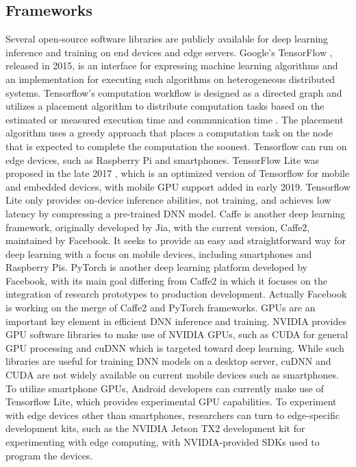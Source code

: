 \subsection{Frameworks}
Several open-source software libraries are publicly available for deep learning inference and training on end devices and edge servers. Google's TensorFlow \cite{tensorflow2015-whitepaper}, released in 2015, is an interface for expressing machine learning algorithms and an implementation for executing such algorithms on heterogeneous distributed systems. Tensorflow's computation workflow is designed as a directed graph and utilizes a placement algorithm to distribute computation tasks based on the estimated or measured execution time and communication time \cite{abadi2016tensorflow}. The placement algorithm uses a greedy approach that places a computation task on the node that is expected to complete the computation the soonest. Tensorflow can run on edge devices, such as Raspberry Pi and smartphones. TensorFlow Lite was proposed in the late 2017 \cite{tensorflowlite}, which is an optimized version of Tensorflow for mobile and embedded devices, with mobile GPU support added in early 2019. 
Tensorflow Lite only provides on-device inference abilities, not training, and achieves low latency by compressing a pre-trained DNN model.
Caffe \cite{Caffe} is another deep learning framework, originally developed by Jia, with the current version, Caffe2, maintained by Facebook. It seeks to provide an easy and straightforward way for deep learning with a focus on mobile devices, including smartphones and Raspberry Pis. PyTorch \cite{NEURIPS2019_9015} is another deep learning platform developed by Facebook, with its main goal differing from Caffe2 in which it focuses on the integration of research prototypes to production development. Actually Facebook is working on the merge of Caffe2 and PyTorch frameworks.
GPUs are an important key element in efficient DNN inference and training. NVIDIA provides GPU software libraries to make use of NVIDIA GPUs, such as CUDA \cite{CUDA} for general GPU processing and cuDNN \cite{cuDNN} which is targeted toward deep learning. While such libraries are useful for training DNN models on a desktop server, cuDNN and CUDA are not widely available on current mobile devices such as smartphones. To utilize smartphone GPUs, Android developers can currently make use of Tensorflow Lite, which provides experimental GPU capabilities. To experiment with edge devices other than smartphones, researchers can turn to edge-specific development kits, such as the NVIDIA Jetson TX2 development kit for experimenting with edge computing, with NVIDIA-provided SDKs used to program the devices.



